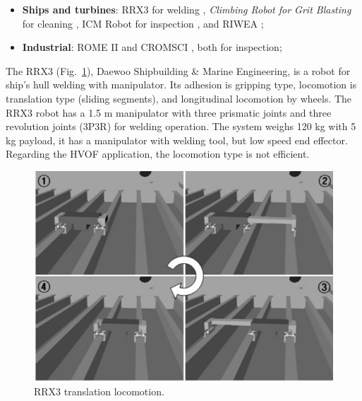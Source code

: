 \begin{itemize}
  \item \textbf{Ships and turbines}: RRX3 for welding
   \citep{rrx3}, \textit{Climbing Robot for Grit Blasting} for cleaning
   \citep{crgb}, ICM Robot for inspection \citep{icm}, and RIWEA \citep{riwea};
  \item \textbf{Industrial}: ROME II \citep{roma} and CROMSCI \citep{CROMSCI}, both for inspection;
\end{itemize}

The RRX3 (Fig.~\ref{rrx3}), Daewoo Shipbuilding \& Marine Engineering, is a
robot for ship's hull welding with manipulator. Its adhesion is gripping
type, locomotion is translation type (sliding segments), and longitudinal locomotion by wheels.
The RRX3 robot has a 1.5 m manipulator with three prismatic joints and three
revolution joints  (3P3R) for welding operation. The system weighs 120 kg with 5
kg payload, it has a manipulator with welding tool, but low speed end effector.
Regarding the HVOF application, the locomotion type is not efficient.


\begin{figure}[ht]
\centering
\includegraphics[scale=0.25]{figs/climbers/RRX3_moving.jpg}
\caption{RRX3 translation locomotion.}
\label{rrx3}
\end{figure}

